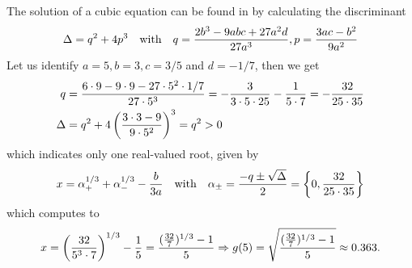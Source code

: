 \documentclass[12pt,onecolumn,final,letterpaper]{IEEEtran}
\newif\ifarxiv\arxivfalse
\begin{document}
%
The solution of a cubic equation can be found in \cite[2.3.2]{Zwi03} by calculating the discriminant
%
\begin{align}
  \Delta=q^2+4p^3 \quad\text{with}\quad q=\frac{2b^3-9abc+27a^2d}{27a^3},p=\frac{3ac-b^2}{9a^2}
\end{align}
%
Let us identify $a=5,b=3,c=3/5$ and $d=-1/7$, then we get
%
\begin{align}
  q&=\frac{6\cdot 9-9\cdot 9 - 27\cdot 5^2\cdot1/7}{27\cdot 5^3}
  =-\frac{3}{3\cdot 5\cdot 25} -\frac{1}{5\cdot 7}=-\frac{32}{25\cdot35}\\
  \Delta&=q^2 + 4 \left(\frac{3\cdot 3 -9}{9\cdot 5^2}\right)^3=q^2>0
\end{align}
%
which indicates only one real-valued root, given by
%
\begin{align}
  x=\alpha_+^{1/3}+\alpha_-^{1/3}-\frac{b}{3a} 
  \quad\text{with}\quad  \alpha_{\pm}=\frac{-q\pm\sqrt{\Delta}}{2} = \left\{0, \frac{32}{25\cdot 35} \right\}
\end{align}
%
which computes to
%
\begin{align}
  x=\left( \frac{32}{5^3\cdot 7}\right)^{1/3}- \frac{1}{5}
  =\frac{(\frac{32}{7})^{1/3}-1}{5} \Rightarrow g(5)=\sqrt{\frac{(\frac{32}{7})^{1/3}-1}{5}} \approx 0.363.
\end{align}
%
\fi %


\ifarxiv%
%
\end{document}
